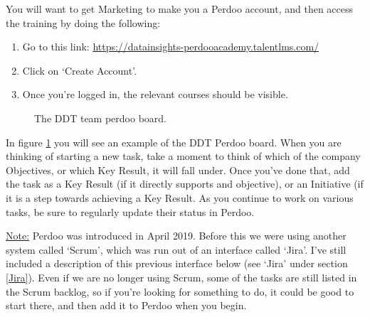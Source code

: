 \documentclass[11pt]{report}
\begin{document}
You will want to get Marketing to make you a Perdoo account, and then access the training by doing the following:
\begin{enumerate}
\item Go to this link: \href{https://datainsights-perdooacademy.talentlms.com/}{https://datainsights-perdooacademy.talentlms.com/}
\item Click on `Create Account'.
\item Once you're logged in, the relevant courses should be visible.
\end{enumerate}

\begin{figure}[!htb]
       \caption{\label{fig:perdoo} The DDT team perdoo board.}
\end{figure}

In figure \ref{fig:perdoo} you will see an example of the DDT Perdoo board. When you are thinking of starting a new task, take a moment to think of which of the company Objectives, or which Key Result, it will fall under. Once you've done that, add the task as a Key Result (if it directly supports and objective), or an Initiative (if it is a step towards achieving a Key Result. As you continue to work on various tasks, be sure to regularly update their status in Perdoo.

\underline{Note:} Perdoo was introduced in April 2019. Before this we were using another system called `Scrum', which was run out of an interface called `Jira'. I've still included a description of this previous interface below (see `Jira' under section \ref{Jira}). Even if we are no longer using Scrum, some of the tasks are still listed in the Scrum backlog, so if you're looking for something to do, it could be good to start there, and then add it to Perdoo when you begin.
\end{document}

